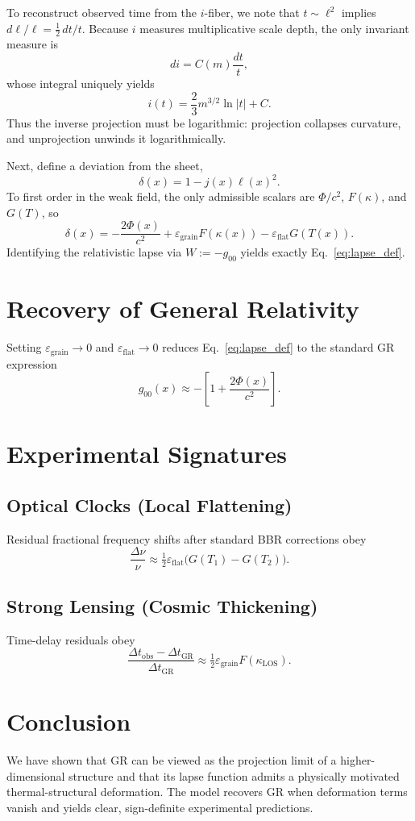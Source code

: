\documentclass[11pt]{article}
\begin{document}
To reconstruct observed time from the $i$-fiber, we note that $t\sim \ell^{2}$ implies $d\ell/\ell=\tfrac12\,dt/t$. Because $i$ measures multiplicative scale depth, the only invariant measure is
\[
 di=C(m)\frac{dt}{t},
\]
whose integral uniquely yields
\[
 i(t)=\frac{2}{3}m^{3/2}\ln|t|+C.
\]
Thus the inverse projection must be logarithmic: projection collapses curvature, and unprojection unwinds it logarithmically.

Next, define a deviation from the sheet,
\[
 \delta(x)=1-j(x)\ell(x)^{2}.
\]
To first order in the weak field, the only admissible scalars are $\Phi/c^{2}$, $F(\kappa)$, and $G(T)$, so
\[
 \delta(x)= -\frac{2\Phi(x)}{c^{2}}+\varepsilon_{\mathrm{grain}}F(\kappa(x))-\varepsilon_{\mathrm{flat}}G(T(x)).
\]
Identifying the relativistic lapse via $W:=-g_{00}$ yields exactly Eq.~\eqref{eq:lapse_def}.

\section{Recovery of General Relativity}

Setting $\varepsilon_{\mathrm{grain}}\to 0$ and $\varepsilon_{\mathrm{flat}}\to 0$ reduces Eq.~\eqref{eq:lapse_def} to the standard GR expression
\[
 g_{00}(x)\approx -\left[1+\frac{2\Phi(x)}{c^2}\right].
\]

\section{Experimental Signatures}

\subsection{Optical Clocks (Local Flattening)}
Residual fractional frequency shifts after standard BBR corrections obey
\[
 \frac{\Delta\nu}{\nu}\approx \tfrac12\varepsilon_{\mathrm{flat}}\big(G(T_1)-G(T_2)\big).
\]

\subsection{Strong Lensing (Cosmic Thickening)}
Time-delay residuals obey
\[
 \frac{\Delta t_{\mathrm{obs}}-\Delta t_{\mathrm{GR}}}{\Delta t_{\mathrm{GR}}}
 \approx \tfrac12\varepsilon_{\mathrm{grain}}F(\kappa_{\mathrm{LOS}}).
\]

\section{Conclusion}

We have shown that GR can be viewed as the projection limit of a higher-dimensional structure and that its lapse function admits a physically motivated thermal-structural deformation. The model recovers GR when deformation terms vanish and yields clear, sign-definite experimental predictions.
\end{document}
